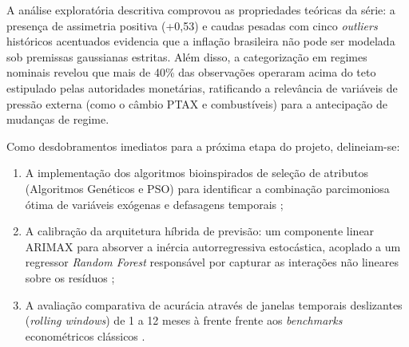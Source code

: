 \documentclass[10pt,twoside]{article}
\begin{document}
A análise exploratória descritiva comprovou as propriedades teóricas da série: a presença de assimetria positiva (+0,53) e caudas pesadas com cinco \textit{outliers} históricos acentuados evidencia que a inflação brasileira não pode ser modelada sob premissas gaussianas estritas. Além disso, a categorização em regimes nominais revelou que mais de 40\% das observações operaram acima do teto estipulado pelas autoridades monetárias, ratificando a relevância de variáveis de pressão externa (como o câmbio PTAX e combustíveis) para a antecipação de mudanças de regime.

Como desdobramentos imediatos para a próxima etapa do projeto, delineiam-se:
\begin{enumerate}[leftmargin=1.5em]
    \item A implementação dos algoritmos bioinspirados de seleção de atributos (Algoritmos Genéticos e PSO) para identificar a combinação parcimoniosa ótima de variáveis exógenas e defasagens temporais \cite{ref8, ref11};
    \item A calibração da arquitetura híbrida de previsão: um componente linear ARIMAX para absorver a inércia autorregressiva estocástica, acoplado a um regressor \textit{Random Forest} responsável por capturar as interações não lineares sobre os resíduos \cite{ref14, ref18};
    \item A avaliação comparativa de acurácia através de janelas temporais deslizantes (\textit{rolling windows}) de 1 a 12 meses à frente frente aos \textit{benchmarks} econométricos clássicos \cite{ref6, ref9}.
\end{enumerate}

\end{document}
